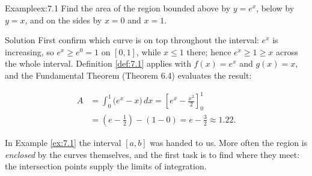 \documentclass[a4paper,12pt,oneside]{memoir}
\begin{document}
\begin{workedexample}
\begin{envexample}{Example}{ex:7.1}{}
Find the area of the region bounded above by \(y = e^{x}\), below by \(y = x\), and on the sides by \(x = 0\) and \(x = 1\).
\end{envexample}
\begin{envsolution}{Solution}{}{}
First confirm which curve is on top throughout the interval: \(e^{x}\) is increasing, so \(e^{x} \ge e^{0} = 1\) on \([0, 1]\), while \(x \le 1\) there; hence \(e^{x} \ge 1 \ge x\) across the whole interval. Definition \ref{def:7.1} applies with \(f(x) = e^{x}\) and \(g(x) = x\), and the Fundamental Theorem (Theorem 6.4) evaluates the result:

\[ \begin{aligned}
          A &= \int_{0}^{1} \bigl(e^{x} - x\bigr)\,dx = \left[e^{x} - \frac{x^{2}}{2}\right]_{0}^{1} \\[2pt]
            &= \left(e - \frac{1}{2}\right) - (1 - 0) = e - \frac{3}{2} \approx 1.22.
        \end{aligned} \]\qedmark
\end{envsolution}
\end{workedexample}
In Example \ref{ex:7.1} the interval \([a, b]\) was handed to us. More often the region is \emph{enclosed} by the curves themselves, and the first task is to find where they meet: the intersection points supply the limits of integration.
\end{document}
